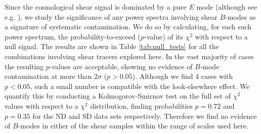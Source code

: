 \documentclass[a4paper,11pt]{article}
\newcommand{\northd}{ND\xspace}
\newcommand{\southd}{SD\xspace}
\begin{document}
      Since the cosmological shear signal is dominated by a pure $E$ mode (although see e.g. \citep{0904.4703} ), we study the significance of any power spectra involving shear $B$-modes as a signature of systematic contamination. We do so by calculating, for each such power spectrum, the probability-to-exceed ($p$-value) of its $\chi^2$ with respect to a null signal. The results are shown in Table \ref{tab:null_tests} for all the combinations involving shear tracers explored here. In the vast majority of cases the resulting $p$-values are acceptable, showing no evidence of $B$-mode contamination at more than 2$\sigma$ ($p>0.05$). Although we find 4 cases with $p<0.05$, such a small number is compatible with the look-elsewhere effect. We quantify this by conducting a Kolmogorov-Smirnov test on the full set of $\chi^2$ values with respect to a $\chi^2$ distribution, finding probabilities $p=0.72$ and $p=0.35$ for the \northd and \southd data sets respectively. Therefore we find no evidence of $B$-modes in either of the shear samples within the range of scales used here.
      
\end{document}
